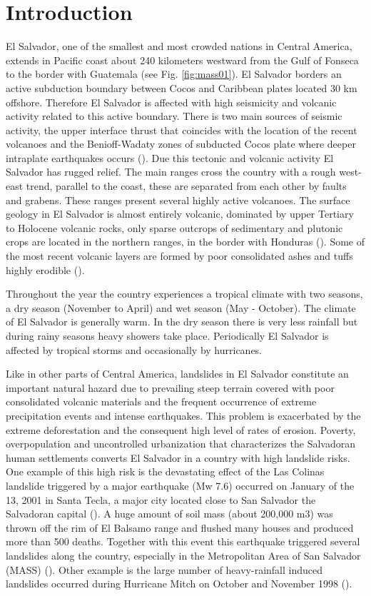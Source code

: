 \documentclass[11pt,twoside]{rmta2010esp}%
\begin{document}
\section{Introduction}
\label{sec:intr}
El Salvador, one of the smallest and most crowded nations in Central America, extends in Pacific coast about 240 kilometers westward from the Gulf of Fonseca to the border with Guatemala (see Fig. \ref{fig:mass01}). El Salvador borders an active subduction boundary between Cocos and Caribbean plates located 30 km offshore. Therefore El Salvador is affected with high seismicity and volcanic activity related to this active boundary. There is two main sources of seismic activity, the upper interface thrust that coincides with the location of the recent volcanoes and the Benioff-Wadaty zones of subducted Cocos plate where deeper intraplate earthquakes occurs (\cite{dewey}). Due this tectonic and volcanic activity El Salvador has rugged relief. The main ranges cross the country with a rough west-east trend, parallel to the coast, these are separated from each other by faults and grabens. These ranges present several highly active volcanoes. The surface geology in El Salvador is almost entirely volcanic, dominated by upper Tertiary to Holocene volcanic rocks, only sparse outcrops of sedimentary and plutonic crops are located in the northern ranges, in the border with Honduras (\cite{weber}). Some of the most recent volcanic layers are formed by poor consolidated ashes and tuffs highly erodible (\cite{bommer}).

Throughout the year the country experiences a tropical climate with two seasons, a dry season (November to April) and wet season (May - October). The climate of El Salvador is generally warm. In the dry season there is very less rainfall but during rainy seasons heavy showers take place. Periodically El Salvador is affected by tropical storms and occasionally by hurricanes.

Like in other parts of Central America, landslides in El Salvador constitute an important natural hazard due to prevailing steep terrain covered with poor consolidated volcanic materials and the frequent occurrence of extreme precipitation events and intense earthquakes. This problem is exacerbated by the extreme deforestation and the consequent high level of rates of erosion. Poverty, overpopulation and uncontrolled urbanization that characterizes the Salvadoran human settlements converts El Salvador in a country with high landslide risks.
One example of this high risk is the devastating effect of the Las Colinas landslide triggered by a major earthquake (Mw 7.6) occurred on January of the 13, 2001  in Santa Tecla, a major city located close to San Salvador  the Salvadoran capital (\cite{evans}). A huge amount of soil mass (about 200,000 m3) was thrown off the rim of El Balsamo range and flushed many houses and produced more than 500 deaths. Together with this event this earthquake triggered several landslides along the country, especially in the Metropolitan Area of San Salvador (MASS) (\cite{jibson}). Other example is the large number of heavy-rainfall induced landslides occurred during Hurricane Mitch on October and November 1998 (\cite{crone}).   
\end{document}
